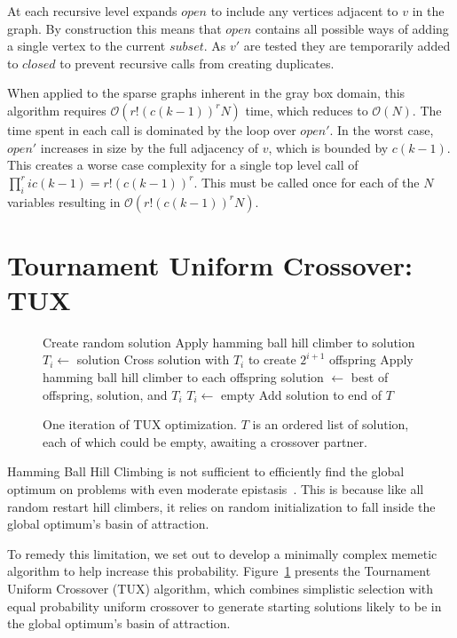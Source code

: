 \documentclass{sig-alternate}
\newcommand{\BigO}[1]{$\mathcal{O}{(#1)}$}
\begin{document}
At each recursive level  expands $open$ to include any vertices
adjacent to $v$ in the graph. By construction this means that $open$ contains
all possible ways of adding a single vertex to the current $subset$. As $v'$
are tested they are temporarily added to $closed$ to prevent recursive calls
from creating duplicates.

When applied to the sparse graphs inherent in the gray box domain, this algorithm
requires \BigO{r!(c(k-1))^rN} time, which reduces to \BigO{N}. The time spent
in each call is dominated by the loop over $open'$. In the worst case, $open'$
increases in size by the full adjacency of $v$, which is bounded by $c(k-1)$.
This creates a worse case complexity for a single top level call of
$\prod_{i}^{r} ic(k-1) = r!(c(k-1))^r$. This must be called once for each
of the $N$ variables resulting in \BigO{r!(c(k-1))^rN}.

\section{Tournament Uniform Crossover: TUX}
\begin{figure}
  \begin{algorithmic}[1]
    \State Create random solution
    \State Apply hamming ball hill climber to solution
        \State $T_i \leftarrow$ solution
        \State \Return
      \EndIf
      \State Cross solution with $T_i$ to create $2^{i+1}$ offspring
      \State Apply hamming ball hill climber to each offspring
      \State solution $\leftarrow$ best of offspring, solution, and $T_i$
      \State $T_i \leftarrow$ empty
    \EndFor
    \State Add solution to end of $T$
  \EndProcedure
\end{algorithmic}
  \caption{One iteration of TUX optimization. $T$ is an
           ordered list of solution, each of which could be empty,
           awaiting a crossover partner.}
  \label{fig-TUX}
\end{figure}

Hamming Ball Hill Climbing is not sufficient to efficiently find the global optimum
on problems with even moderate epistasis~\cite{chicano:2014:ball}. This is because
like all random restart hill climbers, it relies on random initialization to fall
inside the global optimum's basin of attraction.

To remedy this limitation, we set out to develop a minimally complex memetic
algorithm to help increase this probability. Figure~\ref{fig-TUX} presents
the Tournament Uniform Crossover (TUX) algorithm, which combines simplistic
selection with equal probability uniform crossover to generate starting
solutions likely to be in the global optimum's basin of attraction.
\end{document}
